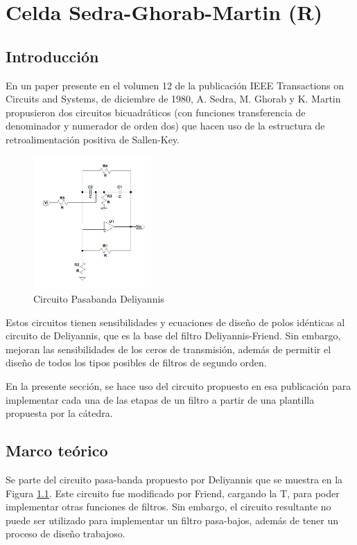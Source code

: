 \chapter{Celda Sedra-Ghorab-Martin (R)}

\section{Introducción}
En un paper presente en el volumen 12 de la publicación IEEE Transactions on Circuits and Systems, de diciembre de 1980, A. Sedra, M. Ghorab y K. Martin propusieron dos circuitos bicuadráticos (con funciones transferencia de denominador y numerador de orden dos) que hacen uso de la estructura de retroalimentación positiva de Sallen-Key. 

\begin{figure}[H]
\begin{centering}
\includegraphics[width=0.4\textwidth]{../Ex3/Resources/Deliyannis}
\par\end{centering}
\caption{Circuito Pasabanda Deliyannis}
\label{3_1}
\end{figure}

Estos circuitos tienen sensibilidades y ecuaciones de diseño de polos idénticas al circuito de Deliyannis, que es la base del filtro Deliyannis-Friend. Sin embargo, mejoran las sensibilidades de los ceros de transmisión, además de permitir el diseño de todos los tipos posibles de filtros de segundo orden.

En la presente sección, se hace uso del circuito propuesto en esa publicación para implementar cada una de las etapas de un filtro a partir de una plantilla propuesta por la cátedra.

\section{Marco teórico} \label{marcoteorico}
Se parte del circuito pasa-banda propuesto por Deliyannis que se muestra en la
Figura \ref{3_1}. Este circuito fue modificado por Friend, cargando la T, para poder implementar otras funciones de filtros. Sin embargo, el circuito resultante no puede ser utilizado para implementar un filtro pasa-bajos, además de tener un proceso de diseño trabajoso.

